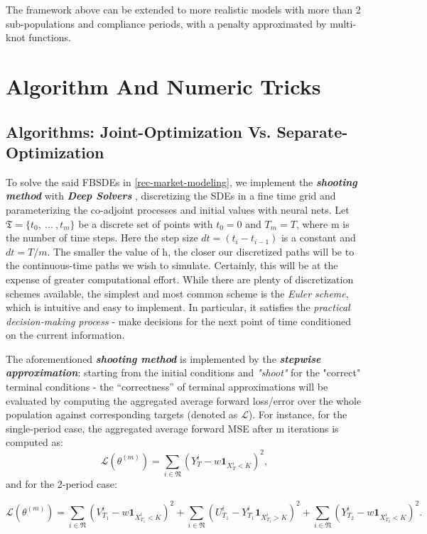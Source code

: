 \documentclass[a4paper,10pt]{article}
\newcommand{\1}{\mathbf{1}}
\begin{document}
The framework above can be extended to more realistic models with more
than 2 sub-populations and compliance periods, with a penalty approximated
by multi-knot functions.

\section{Algorithm And Numeric
Tricks}

\subsection{Algorithms: Joint-Optimization Vs.
Separate-Optimization}

To solve the said FBSDEs in \ref{rec-market-modeling}, we
implement the \textbf{\emph{shooting method}} with \emph{\textbf{Deep Solvers}}
\cite{JH}, discretizing the SDEs in a fine time grid and parameterizing the
co-adjoint processes and initial values with neural nets. Let
\(\mathfrak{T}=\lbrace{t_0,~...~, t_m \rbrace}\) be a discrete set of
points with \(t_0=0\) and \(T_m=T\), where m is the number of time
steps. Here the step size \(dt=(t_i-t_{i-1})\) is a constant and
\(dt=T/m\). The smaller the value of h, the closer our discretized paths
will be to the continuous-time paths we wish to simulate. Certainly,
this will be at the expense of greater computational effort. While there
are plenty of discretization schemes available, the simplest and most
common scheme is the \emph{Euler scheme}, which is intuitive and easy to
implement. In particular, it satisfies the \emph{practical
decision-making process} - make decisions for the next point of time
conditioned on the current information.

The aforementioned \textbf{\emph{shooting method}} is implemented by the
\textbf{\textit{stepwise approximation}}: starting from the initial conditions and
\emph{"shoot"} for the "correct" terminal conditions - the
``correctness'' of terminal approximations will be evaluated by
computing the aggregated average forward loss/error over the whole
population against corresponding targets (denoted as \(\mathcal{L}\)).
For instance, for the single-period case, the aggregated average forward
MSE after m iterations is computed as: \[
\mathcal{L}(\theta^{(m)})= \sum_{i\in\mathfrak{N}}(Y_{T}^i-w\mathbf{1}_{X_{T}^i<K})^2,
\] and for the 2-period case:

\[
\mathcal{L}(\theta^{(m)})= \sum_{i\in\mathfrak{N}}(V_{T_1}^i-w\mathbf{1}_{X_{T_1}^i<K})^2 + \sum_{i\in\mathfrak{N}}(U_{T_1}^i-Y_{T_1}^i\mathbf{1}_{X_{T_1}^i>K})^2 + \sum_{i\in\mathfrak{N}}(Y_{T_2}^i-w\mathbf{1}_{X_{T_2}^i<K})^2.
\]
\end{document}

